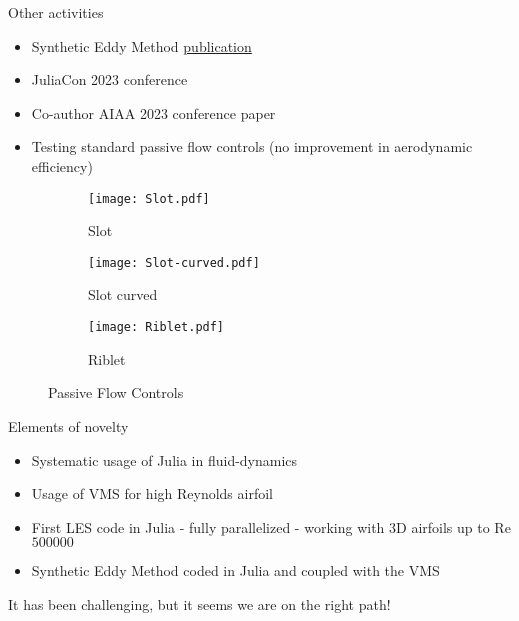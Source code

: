 \begin{frame}{Other activities}
    \begin{itemize}
        \item Synthetic Eddy Method \href{https://www.theoj.org/joss-papers/joss.05565/10.21105.joss.05565.pdf}{publication}
        \item JuliaCon 2023 conference
        \item Co-author AIAA 2023 conference paper
    \end{itemize}
    
    \begin{itemize}
        \item Testing standard passive flow controls (no improvement in aerodynamic efficiency)
    \end{itemize}
    \begin{figure}[h]
        \centering          
        \begin{subfigure}[h]{0.30\textwidth}
                 \centering
            \texttt{[image: Slot.pdf]}
            \caption{Slot}
       \end{subfigure}
       \hfill	
       \begin{subfigure}[h]{0.30\textwidth}
                \centering
           \texttt{[image: Slot-curved.pdf]}
           \caption{Slot curved}
        \end{subfigure}
             \hfill
        \begin{subfigure}[h]{0.30\textwidth}
         \centering
            \texttt{[image: Riblet.pdf]}
            \caption{Riblet}
        \end{subfigure}
        \caption{Passive Flow Controls}
        \end{figure} 
    \end{frame}
    
    
    
    \begin{frame}{Elements of novelty}
    \begin{itemize}
        \item Systematic usage of Julia in fluid-dynamics
        \item Usage of VMS for high Reynolds airfoil
        \item First LES code in Julia - fully parallelized - working with 3D airfoils up to Re $\num{500000}$ 
        \item Synthetic Eddy Method coded in Julia and coupled with the VMS
    \end{itemize}
    
    It has been challenging, but it seems we are on the right path!
    
    \end{frame}
    
